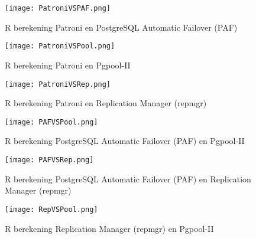 \begin{figure}[!h]
    \centering
    \texttt{[image: PatroniVSPAF.png]}
    \caption{R berekening Patroni en PostgreSQL Automatic Failover (PAF)}
    \label{fig:R berekening Patroni en PostgreSQL Automatic Failover (PAF)}
\end{figure}

\begin{figure}[!h]
    \centering
    \texttt{[image: PatroniVSPool.png]}
    \caption{R berekening Patroni en Pgpool-II}
    \label{fig:R berekening Patroni en Pgpool-II}
\end{figure}

\begin{figure}[!h]
    \centering
    \texttt{[image: PatroniVSRep.png]}
    \caption{R berekening Patroni en Replication Manager (repmgr)}
    \label{fig:R berekening Patroni en Replication Manager (repmgr)}
\end{figure}

\begin{figure}[!h]
    \centering
    \texttt{[image: PAFVSPool.png]}
    \caption{R berekening PostgreSQL Automatic Failover (PAF) en Pgpool-II}
    \label{fig:R berekening PostgreSQL Automatic Failover (PAF) en Pgpool-II}
\end{figure}

\begin{figure}[!h]
    \centering
    \texttt{[image: PAFVSRep.png]}
    \caption{R berekening PostgreSQL Automatic Failover (PAF) en Replication Manager (repmgr)}
    \label{fig:R berekening PostgreSQL Automatic Failover (PAF) en Replication Manager (repmgr)}
\end{figure}

\begin{figure}[!h]
    \centering
    \texttt{[image: RepVSPool.png]}
    \caption{R berekening Replication Manager (repmgr) en Pgpool-II}
    \label{fig:R berekening Replication Manager (repmgr) en Pgpool-II}
\end{figure}



